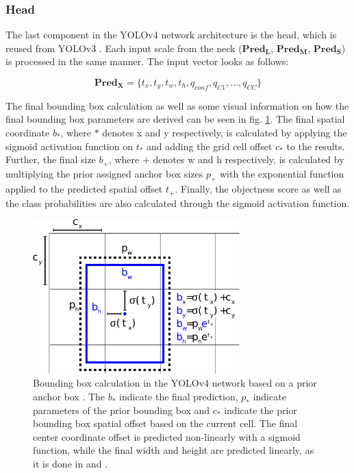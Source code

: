 \subsubsection{Head}
The last component in the \ac{YOLOv4} network architecture is the head, which is reused from YOLOv3 \cite{yolov3}.
Each input scale from the neck ($\mathbf{Pred_{L}}$, $\mathbf{Pred_{M}}$, $\mathbf{Pred_{S}}$) is processed in the same manner.
The input vector looks as follows:

\begin{equation}
    \mathbf{Pred_{X}} = \{t_x, t_y, t_w, t_h, q_{conf}, q_{C1},...,q_{CC}\}
\end{equation}

The final bounding box calculation as well as some visual information on how the final bounding box parameters are derived can be seen in fig. \ref{fig:bbox_calculation}.
The final spatial coordinate $b_*$, where $*$ denotes x and y respectively, is calculated by applying the sigmoid activation function on $t_*$ and adding the grid cell offset $c_*$ to the results.
Further, the final size $b_+$, where $+$ denotes w and h respectively, is calculated by multiplying the prior assigned anchor box sizes $p_+$ with the exponential function applied to the predicted spatial offset $t_+$.
Finally, the objectness score as well as the class probabilities are also calculated through the sigmoid activation function.

\begin{figure}
\begin{center}
    \includegraphics[width=8cm]{imgs/bbox_calculation.pdf}
    \caption{Bounding box calculation in the YOLOv4 network based on a prior anchor box \cite{yolov2}. The $b_*$ indicate the final prediction, $p_*$ indicate parameters of the prior bounding box and $c_*$ indicate the prior bounding box spatial offset based on the current cell. The final center coordinate offset is predicted non-linearly with a sigmoid function, while the final width and height are predicted linearly, as it is done in \cite{fast_rcnn} and \cite{faster_rcnn}.}
    \label{fig:bbox_calculation}
\end{center}
\end{figure}

